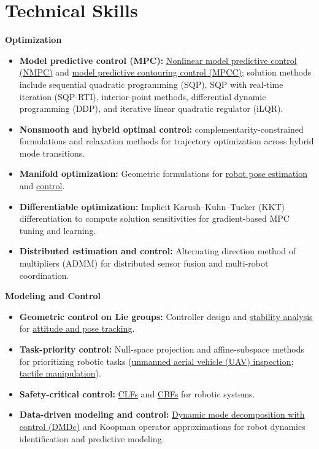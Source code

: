\documentclass[letterpaper,11pt]{article}
\begin{document}
\section{Technical Skills}
{\small\textbf{Optimization}\par}
\begin{itemize}[leftmargin=0.22in, itemsep=2pt, parsep=0pt, topsep=4pt]
\small
\item \textbf{Model predictive control (MPC):} \href{https://arxiv.org/abs/2510.11525}{Nonlinear model predictive control (NMPC)} and \href{https://arxiv.org/abs/2609.36482}{model predictive contouring control (MPCC)}; solution methods include sequential quadratic programming (SQP), SQP with real-time iteration (SQP-RTI), interior-point methods, differential dynamic programming (DDP), and iterative linear quadratic regulator (iLQR).
\item \textbf{Nonsmooth and hybrid optimal control:} complementarity-constrained formulations and relaxation methods for trajectory optimization across hybrid mode transitions.
\item \textbf{Manifold optimization:} Geometric formulations for \href{https://arxiv.org/abs/2410.13541}{robot pose estimation} and \href{https://arxiv.org/abs/2510.11525}{control}.
\item \textbf{Differentiable optimization:} Implicit Karush--Kuhn--Tucker (KKT) differentiation to compute solution sensitivities for gradient-based MPC tuning and learning.
\item \textbf{Distributed estimation and control:} Alternating direction method of multipliers (ADMM) for distributed sensor fusion and multi-robot coordination.
\end{itemize}
{\small\textbf{Modeling and Control}\par}
\begin{itemize}[leftmargin=0.22in, itemsep=2pt, parsep=0pt, topsep=4pt]
\small
\item \textbf{Geometric control on Lie groups:} Controller design and \href{https://arxiv.org/abs/2504.08841}{stability analysis} for \href{https://arxiv.org/abs/2510.11525}{attitude and pose tracking}.
\item \textbf{Task-priority control:} Null-space projection and affine-subspace methods for prioritizing robotic tasks (\href{https://arxiv.org/abs/2311.08019}{unmanned aerial vehicle (UAV) inspection}; \href{https://arxiv.org/abs/2605.20392}{tactile manipulation}).
\item \textbf{Safety-critical control:} \href{https://arxiv.org/abs/2504.08841}{CLFs} and \href{https://arxiv.org/abs/2504.08841}{CBFs} for robotic systems.
\item \textbf{Data-driven modeling and control:} \href{https://www.mdpi.com/1424-8220/22/13/4712}{Dynamic mode decomposition with control (DMDc)} and Koopman operator approximations for robot dynamics identification and predictive modeling.
\end{itemize}
\newpage
\end{document}
